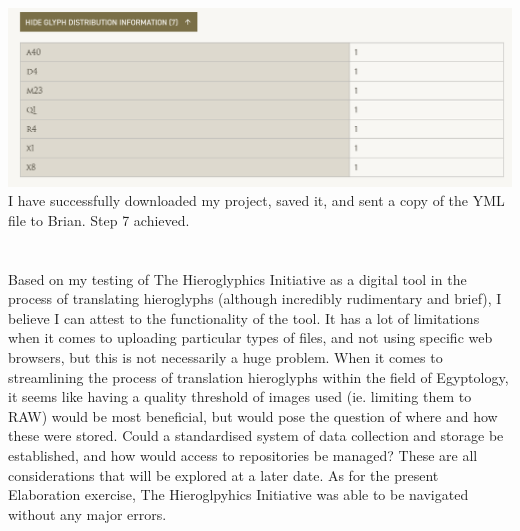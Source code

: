 \documentclass{article}
\begin{document}
\newline \break
\includegraphics[width=1.0\textwidth]{hiero_19.PNG}
\break \noindent
I have successfully downloaded my project, saved it, and sent a copy of the YML file to Brian.
\newline \break \noindent
Step 7 achieved.
\paragraph{} ~\\\noindent
Based on my testing of The Hieroglyphics Initiative as a digital tool in the process of translating hieroglyphs (although incredibly rudimentary and brief), I believe I can attest to the functionality of the tool. It has a lot of limitations when it comes to uploading particular types of files, and not using specific web browsers, but this is not necessarily a huge problem. When it comes to streamlining the process of translation hieroglyphs within the field of Egyptology, it seems like having a quality threshold of images used (ie. limiting them to RAW) would be most beneficial, but would pose the question of where and how these were stored. Could a standardised system of data collection and storage be established, and how would access to repositories be managed? These are all considerations that will be explored at a later date. As for the present Elaboration exercise, The Hieroglpyhics Initiative was able to be navigated without any major errors.
\end{document}
